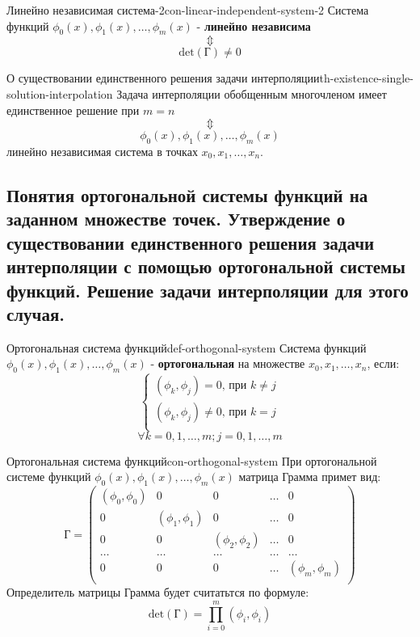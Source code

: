 \documentclass[14pt]{extarticle}
\begin{document}
    \begin{consequence}{Линейно независимая система-2}{con-linear-independent-system-2}
        Система функций $\phi_{0}(x), \phi_{1}(x), \ldots, \phi_{m}(x)$ - \textbf{линейно независима} 
        $$\Updownarrow$$ 
        $$\text{det}(\text{Г}) \neq 0$$
    \end{consequence}

    \begin{theorem}{О существовании единственного решения задачи интерполяции}{th-existence-single-solution-interpolation}
        Задача интерполяции обобщенным многочленом имеет единственное решение при $m = n$
        $$\Updownarrow$$
        $$\phi_{0}(x), \phi_{1}(x), \ldots, \phi_{m}(x)$$
        линейно независимая система в точках $x_{0}, x_{1}, \ldots, x_{n}$. 
    \end{theorem}

\clearpage
\subsection{Понятия ортогональной системы функций на заданном множестве точек. Утверждение о существовании единственного решения задачи интерполяции с помощью ортогональной системы функций. Решение задачи интерполяции для этого случая.}

    \begin{definition}{Ортогональная система функций}{def-orthogonal-system}
        Система функций $\phi_{0}(x), \phi_{1}(x), \ldots, \phi_{m}(x)$ - \textbf{ортогональная} на множестве $x_{0}, x_{1}, \ldots, x_{n}$, если:
        $$
        \begin{cases}
            (\phi_{k}, \phi_{j}) = 0 \text{, при } k \neq j\\
            (\phi_{k}, \phi_{j}) \neq 0 \text{, при } k = j\\
        \end{cases}
        $$
        $$\forall k = 0, 1, \ldots, m; j = 0, 1, \ldots, m$$
    \end{definition}

    \begin{consequence}{Ортогональная система функций}{con-orthogonal-system}
        При ортогональной системе функций $\phi_{0}(x), \phi_{1}(x), \ldots, \phi_{m}(x)$ матрица Грамма примет вид:
        $$
        \text{Г} = \begin{pmatrix}
            (\phi_{0}, \phi_{0}) & 0 & 0 & \ldots & 0\\
            0 & (\phi_{1}, \phi_{1}) & 0 & \ldots & 0\\
            0 & 0 & (\phi_{2}, \phi_{2}) & \ldots & 0\\
            \ldots & \ldots & \ldots & \ldots & \ldots\\
            0 & 0 & 0 & \ldots & (\phi_{m}, \phi_{m})\\
        \end{pmatrix}
        $$
        Определитель матрицы Грамма будет считатьтся по формуле:
        $$\text{det}(\text{Г}) = \prod_{i = 0}^{m} (\phi_{i}, \phi_{i})$$
    \end{consequence}
\end{document}
